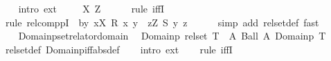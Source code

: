 \begin{isabellebody}
\ \ \isamarkupfalse%
\ {\isacharparenleft}{\kern0pt}intro\ ext{\isacharparenright}{\kern0pt}\isanewline
\ \ \isamarkupfalse%
\ \ X\ Z\isanewline
\ \ \ \ \isamarkupfalse%
\ {\isacharparenleft}{\kern0pt}rule\ iffI{\isacharparenright}{\kern0pt}\isanewline
\ \ \ \ \isamarkupfalse%
\ {\isacharparenleft}{\kern0pt}rule\ relcomppI\ {\isacharbrackleft}{\kern0pt}\ b{\isacharequal}{\kern0pt}{\isachardoublequoteopen}{\isacharbraceleft}{\kern0pt}y{\isachardot}{\kern0pt}\ {\isacharparenleft}{\kern0pt}{\isasymexists}x{\isasymin}X{\isachardot}{\kern0pt}\ R\ x\ y{\isacharparenright}{\kern0pt}\ {\isasymand}\ {\isacharparenleft}{\kern0pt}{\isasymexists}z{\isasymin}Z{\isachardot}{\kern0pt}\ S\ y\ z{\isacharparenright}{\kern0pt}{\isacharbraceright}{\kern0pt}{\isachardoublequoteclose}{\isacharbrackright}{\kern0pt}{\isacharparenright}{\kern0pt}\isanewline
\ \ \ \ \isamarkupfalse%
\ {\isacharparenleft}{\kern0pt}simp\ add{\isacharcolon}{\kern0pt}\ rel{\isacharunderscore}{\kern0pt}set{\isacharunderscore}{\kern0pt}def{\isacharcomma}{\kern0pt}\ fast{\isacharparenright}{\kern0pt}{\isacharplus}{\kern0pt}\isanewline
\ \ \ \ \isamarkupfalse%
\isanewline
\ \ \isamarkupfalse%
%
\endisatagproof
{\isafoldproof}%
%
\isadelimproof
\isanewline
%
\endisadelimproof
\isanewline
{}\isamarkupfalse%
\ Domainp{\isacharunderscore}{\kern0pt}set{\isacharbrackleft}{\kern0pt}relator{\isacharunderscore}{\kern0pt}domain{\isacharbrackright}{\kern0pt}{\isacharcolon}{\kern0pt}\isanewline
\ \ {\isachardoublequoteopen}Domainp\ {\isacharparenleft}{\kern0pt}rel{\isacharunderscore}{\kern0pt}set\ T{\isacharparenright}{\kern0pt}\ {\isacharequal}{\kern0pt}\ {\isacharparenleft}{\kern0pt}{\isasymlambda}A{\isachardot}{\kern0pt}\ Ball\ A\ {\isacharparenleft}{\kern0pt}Domainp\ T{\isacharparenright}{\kern0pt}{\isacharparenright}{\kern0pt}{\isachardoublequoteclose}\isanewline
%
\isadelimproof
\ \ %
\endisadelimproof
%
\isatagproof
{}\isamarkupfalse%
\ rel{\isacharunderscore}{\kern0pt}set{\isacharunderscore}{\kern0pt}def\ Domainp{\isacharunderscore}{\kern0pt}iff{\isacharbrackleft}{\kern0pt}abs{\isacharunderscore}{\kern0pt}def{\isacharbrackright}{\kern0pt}\isanewline
\ \ \isamarkupfalse%
\ {\isacharparenleft}{\kern0pt}intro\ ext{\isacharparenright}{\kern0pt}\isanewline
\ \ \isamarkupfalse%
\ {\isacharparenleft}{\kern0pt}rule\ iffI{\isacharparenright}{\kern0pt}\ \isanewline
\ \ \isamarkupfalse%

\end{isabellebody}
